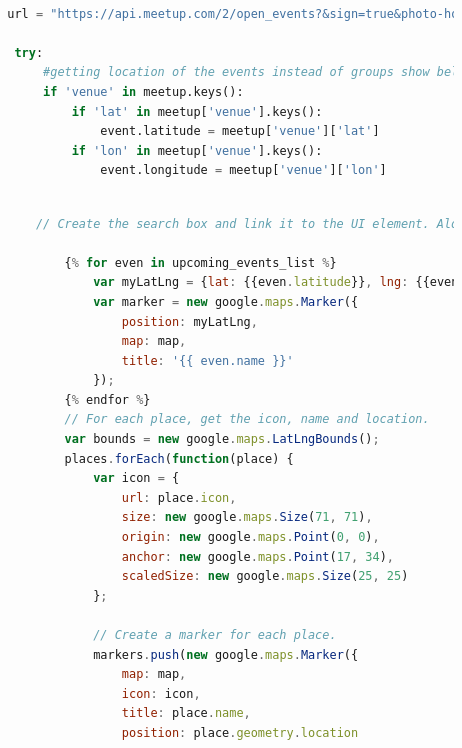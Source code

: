 \documentclass[draftclsnofoot,10pt,onecolumn]{IEEEtran} %
\begin{document}
\begin{center}
\captionsetup{width=.5\linewidth}
	\begin{lstlisting}[caption=Views.py shows the eventSearch funciton that allows the view in the template for the events page to pull information from the database. This also shows the URL used to get the info about events along with how it is stored., language=Python]
       
        url = "https://api.meetup.com/2/open_events?&sign=true&photo-host=public&state=ky&city=lexington&country=usa&topic=" + hashtag.name + "&radius=10000&sign=true&key=" + MEETUP_API_KEY

         try:
             #getting location of the events instead of groups show below - Justin Bruntmyer
             if 'venue' in meetup.keys():
                 if 'lat' in meetup['venue'].keys():
                     event.latitude = meetup['venue']['lat']
                 if 'lon' in meetup['venue'].keys():
                     event.longitude = meetup['venue']['lon']
	\end{lstlisting}
\end{center}

\begin{center}
\captionsetup{width=.5\linewidth}
	\begin{lstlisting}[caption=The eventSearch.html has a mixture of JavaScript and HTML that create the Google Map and search bar along with creating markers for events., language=JavaScript]
           
            // Create the search box and link it to the UI element. Along with creating markers.

                {% for even in upcoming_events_list %}
                    var myLatLng = {lat: {{even.latitude}}, lng: {{even.longitude}}};
                    var marker = new google.maps.Marker({
                        position: myLatLng,
                        map: map,
                        title: '{{ even.name }}'
                    });
                {% endfor %}
                // For each place, get the icon, name and location.
                var bounds = new google.maps.LatLngBounds();
                places.forEach(function(place) {
                    var icon = {
                        url: place.icon,
                        size: new google.maps.Size(71, 71),
                        origin: new google.maps.Point(0, 0),
                        anchor: new google.maps.Point(17, 34),
                        scaledSize: new google.maps.Size(25, 25)
                    };

                    // Create a marker for each place.
                    markers.push(new google.maps.Marker({
                        map: map,
                        icon: icon,
                        title: place.name,
                        position: place.geometry.location
                   
	\end{lstlisting}
\end{center}
\end{document}
